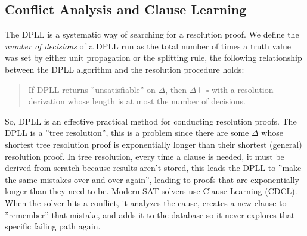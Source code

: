 \documentclass[10pt, letterpaper]{report}
\begin{document}
\subsection{Conflict Analysis and Clause Learning}
 The DPLL is a systematic way of searching for a resolution proof. We define the \textit{number of decisions} of a DPLL run as the total number
 of times a truth value was set by either unit propagation or the splitting rule, the following relationship between the DPLL algorithm and the resolution procedure holds:\begin{quotation}
    If DPLL returns ''unsatisfiable'' on $\Delta$, then $\Delta\models\square$ with a resolution
 derivation whose length is at most the number of decisions.
 \end{quotation}
 So, DPLL is an effective practical method for conducting resolution proofs. The DPLL is a ''tree resolution'', this is a problem since there are some $\Delta$ whose shortest tree resolution proof is exponentially longer than their shortest (general) resolution proof.
 In tree resolution, every time a clause is needed, it must be derived from scratch because results aren't stored, this leads the DPLL to ''make the same mistakes over and over again'', leading to proofs that are exponentially longer than they need to be. Modern SAT solvers use Clause Learning (CDCL). When the solver hits a conflict, it analyzes the cause, creates a new clause to ''remember'' that mistake, and adds it to the database so it never explores that specific failing path again.\bigskip 
\end{document}
